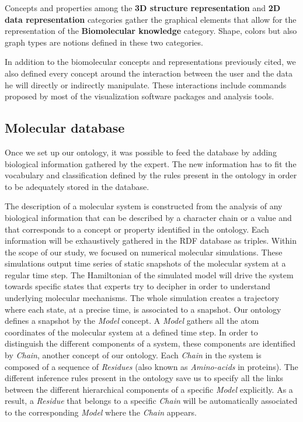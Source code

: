 \documentclass{vgtc}                          %
\begin{document}
Concepts and properties among the \textbf{3D structure representation} and \textbf{2D data representation} categories gather the graphical elements that allow for the representation of the \textbf{Biomolecular knowledge} category. Shape, colors but also graph types are notions defined in these two categories. 

In addition to the biomolecular concepts and representations previously cited, we also defined every concept around the interaction between the user and the data he will directly or indirectly manipulate. These interactions include commands proposed by most of the visualization software packages and analysis tools.

\subsection{Molecular database}

Once we set up our ontology, it was possible to feed the database by adding biological information gathered by the expert. The new information has to fit the vocabulary and classification defined by the rules present in the ontology in order to be adequately stored in the database.

The description of a molecular system is constructed from the analysis of any biological information that can be described by a character chain or a value and that corresponds to a concept or property identified in the ontology. Each information will be exhaustively gathered in the RDF database as triples. Within the scope of our study, we focused on numerical molecular simulations. These simulations output time series of static snapshots of the molecular system at a regular time step. The Hamiltonian of the simulated model will drive the system towards specific states that experts try to decipher in order to understand underlying molecular mechanisms. The whole simulation creates a trajectory where each state, at a precise time, is associated to a snapshot. Our ontology defines a snapshot by the \textit{Model} concept. A \textit{Model} gathers all the atom coordinates of the molecular system at a defined time step. In order to distinguish the different components of a system, these components are identified by \textit{Chain}, another concept of our ontology. Each \textit{Chain} in the system is composed of a sequence of \textit{Residues} (also known as \textit{Amino-acids} in proteins). The different inference rules present in the ontology save us to specify all the links between the different hierarchical components of a specific \textit{Model} explicitly. As a result, a \textit{Residue} that belongs to a specific \textit{Chain} will be automatically associated to the corresponding \textit{Model} where the \textit{Chain} appears.
\end{document}
